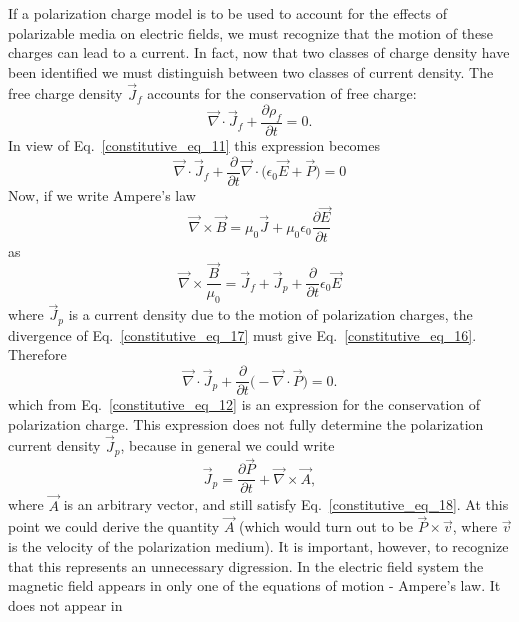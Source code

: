 \documentclass[12pt,a4paper,oneside]{book}
\begin{document}
\begin{onehalfspace}
If a polarization charge model is to be used to account for the effects of polarizable  media on electric fields, we must recognize that the motion of these charges can lead to a current. In fact, now that two classes of charge density have been identified we must distinguish between two classes of current density. The free charge density $\vec{J}_f$ accounts for the conservation of free charge:
 \begin{equation}\label{constitutive_eq_15}
	\vec{\nabla}\cdot\vec{J}_f+\frac{\partial \rho_f}{\partial t}=0.
\end{equation}
In view of Eq.~\eqref{constitutive_eq_11} this expression becomes
 \begin{equation}\label{constitutive_eq_16}
	\vec{\nabla}\cdot\vec{J}_f+\frac{\partial }{\partial t}\vec{\nabla}\cdot\Big(\epsilon_0\vec{E}+\vec{P}\Big)=0
\end{equation}
Now, if we write Ampere's law 
 \begin{equation*}\label{}
	\vec{\nabla}\times\vec{B} = \mu_0\vec{J}+\mu_0\epsilon_0\frac{\partial \vec{E}}{\partial t}
\end{equation*}
as
 \begin{equation}\label{constitutive_eq_17}
	\vec{\nabla}\times\frac{\vec{B}}{\mu_0} = \vec{J}_f+\vec{J}_p+\frac{\partial }{\partial t}\epsilon_0\vec{E}
\end{equation}
where $\vec{J}_p$ is a current density due to the motion of polarization charges, the divergence of Eq.~\eqref{constitutive_eq_17} must give Eq.~\eqref{constitutive_eq_16}. Therefore
 \begin{equation}\label{constitutive_eq_18}
	\vec{\nabla}\cdot\vec{J}_p+\frac{\partial }{\partial t}\big(-\vec{\nabla}\cdot\vec{P}\big) = 0.
\end{equation}
which from Eq.~\eqref{constitutive_eq_12} is an expression for the conservation of polarization charge. This expression does not fully determine the polarization current density $\vec{J}_p$, because in general we could write
\begin{equation}\label{constitutive_eq_19}
 \vec{J}_p=\frac{\partial \vec{P}}{\partial t} + \vec{\nabla}\times\vec{A},
\end{equation}
where $\vec{A}$ is an arbitrary vector, and still satisfy Eq.~\eqref{constitutive_eq_18}. At this point we could derive the quantity $\vec{A}$ (which would turn out to be $\vec{P}\times\vec{v}$, where $\vec{v}$ is the velocity of the polarization medium). It is important, however, to recognize that this represents an unnecessary digression. In the electric field system the magnetic field appears in only one of the equations of motion - Ampere's law. It does not appear in 

\end{onehalfspace}
\end{document}
